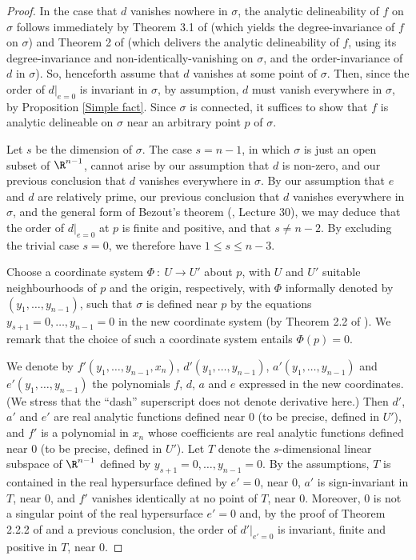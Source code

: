 \documentclass{article}
\begin{document}
\begin{proof} 
In the case that $d$ vanishes nowhere in $\sigma$, the analytic 
delineability of $f$ on $\sigma$ follows immediately by
Theorem 3.1 of \cite{Brown2001} (which yields the degree-invariance of
$f$ on $\sigma$) and Theorem 2 of \cite{McCallum1998} (which delivers
the analytic delineability of $f$, using its degree-invariance 
and non-identically-vanishing on $\sigma$, 
and the order-invariance of $d$ in $\sigma$). 
So, henceforth assume that $d$ vanishes at some 
point of $\sigma$. Then, since the order of $d|_{e=0}$ is invariant in 
$\sigma$,
by assumption, $d$ must vanish everywhere in $\sigma$, 
by Proposition \ref{Simple fact}.
Since $\sigma$ is connected, it suffices to show that $f$ is analytic
delineable on $\sigma$ near an arbitrary point $p$ of $\sigma$.

Let $s$ be the dimension of $\sigma$. The case $s = n-1$, 
in which $\sigma$ is
just an open subset of $\R^{n-1}$, cannot arise by our assumption that
$d$ is non-zero, and our previous conclusion that $d$
vanishes everywhere in $\sigma$.
By our assumption that $e$ and $d$ are relatively prime, 
our previous conclusion that $d$ vanishes everywhere 
in $\sigma$, and the 
general form of Bezout's theorem (\cite{Abhyankar1990}, Lecture 30),
we may deduce that the order of $d|_{e=0}$ at $p$ is finite and 
positive, and that $s \neq n-2$. By excluding the trivial case $s = 0$, 
we therefore have $1 \le s \le n-3$.

Choose a coordinate system $\Phi~:~U \rightarrow U'$ about $p$,
with $U$ and $U'$ suitable neighbourhoods of $p$ and the origin,
respectively, with $\Phi$ informally denoted by $(y_1, \ldots, y_{n-1})$, 
such that
$\sigma$ is defined near $p$ by the equations 
$y_{s+1} = 0, \ldots, y_{n-1} = 0$ in the new coordinate system
(by Theorem 2.2 of \cite{McCallum1988}). We remark that the choice of 
such a coordinate system entails $\Phi(p) = 0$.

We denote by 
$f'(y_1, \ldots, y_{n-1}, x_n)$, $d'(y_1, \ldots, y_{n-1})$, 
$a'(y_1, \ldots, y_{n-1})$ and \\$e'(y_1, \ldots, y_{n-1})$
the polynomials $f$, $d$, $a$ and $e$ expressed in the new coordinates.
(We stress that the ``dash'' superscript does not denote derivative here.)
Then $d'$, $a'$ and $e'$ are real analytic functions defined near $0$
(to be precise, defined in $U'$),
and $f'$ is a polynomial in $x_n$ whose coefficients are real
analytic functions defined near $0$ (to be precise, defined in $U'$).
Let $T$ denote the $s$-dimensional linear
subspace of $\R^{n-1}$ defined by $y_{s+1} = 0, \ldots, y_{n-1} = 0$.
By the assumptions, $T$ is contained in the real hypersurface defined by 
$e' = 0$, near $0$, 
$a'$ is sign-invariant in $T$, near $0$,
and $f'$ vanishes identically at no point
of $T$, near $0$. Moreover, $0$ is not a singular point of
the real hypersurface $e' = 0$ and, by the proof of
Theorem 2.2.2 of \cite{McCallum1985} and a previous conclusion, 
the order of $d'|_{e'=0}$ is invariant, finite and positive in $T$, 
near $0$. 


\end{proof}
\end{document}
